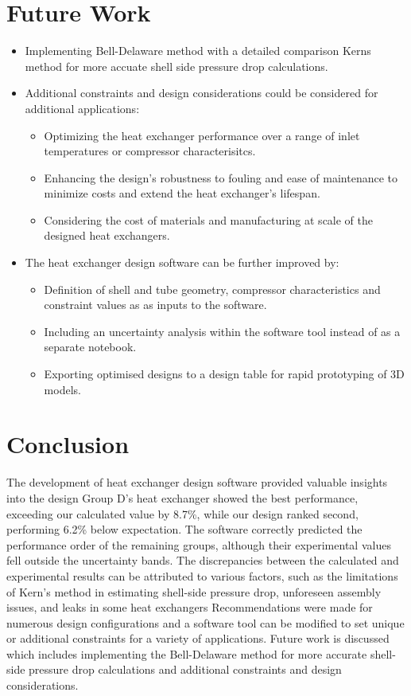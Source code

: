 \documentclass{article}
\begin{document}
\section{Future Work}

\begin{itemize}
    \item Implementing Bell-Delaware method with a detailed comparison Kerns method for more accuate shell side pressure drop calculations.
    \item Additional constraints and design considerations could be considered for additional applications:
    \begin{itemize}
        \item Optimizing the heat exchanger performance over a range of inlet temperatures or compressor characterisitcs.
        \item Enhancing the design's robustness to fouling and ease of maintenance to minimize costs and extend the heat exchanger's lifespan.
        \item Considering the cost of materials and manufacturing at scale of the designed heat exchangers.
    \end{itemize}

    \item The heat exchanger design software can be further improved by:
    \begin{itemize}
        \item Definition of shell and tube geometry, compressor characteristics and constraint values as as inputs to the software.
        \item Including an uncertainty analysis within the software tool instead of as a separate notebook.
        \item Exporting optimised designs to a design table for rapid prototyping of 3D models.
    \end{itemize}
\end{itemize}

\section{Conclusion}

The development of heat exchanger design software provided valuable insights into the design 
Group D's heat exchanger showed the best performance, exceeding our calculated value by 8.7\%, while our design ranked second, performing 6.2\% below expectation.
The software correctly predicted the performance order of the remaining groups, although their experimental values fell outside the uncertainty bands.
The discrepancies between the calculated and experimental results can be attributed to various factors, such as the limitations of Kern's method in estimating shell-side pressure drop, unforeseen assembly issues, and leaks in some heat exchangers
Recommendations were made for numerous design configurations and a software tool can be modified to set unique or additional constraints for a variety of applications.
Future work is discussed which includes implementing the Bell-Delaware method for more accurate shell-side pressure drop calculations and additional constraints and design considerations.
\end{document}
